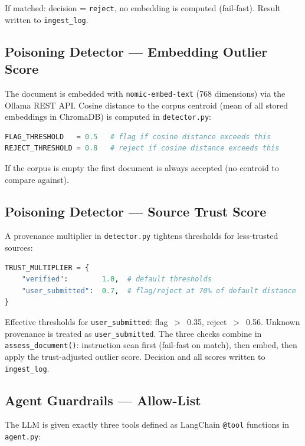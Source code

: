 \documentclass[11pt,a4paper]{article}
\begin{document}
If matched: decision = \texttt{reject}, no embedding is computed (fail-fast).
Result written to \texttt{ingest\_log}.

\subsection{Poisoning Detector --- Embedding Outlier Score}

The document is embedded with \texttt{nomic-embed-text} (768 dimensions) via
the Ollama REST API. Cosine distance to the corpus centroid (mean of all stored
embeddings in ChromaDB) is computed in \texttt{detector.py}:

\begin{lstlisting}[language=Python]
FLAG_THRESHOLD   = 0.5   # flag if cosine distance exceeds this
REJECT_THRESHOLD = 0.8   # reject if cosine distance exceeds this
\end{lstlisting}

If the corpus is empty the first document is always accepted (no centroid to
compare against).

\subsection{Poisoning Detector --- Source Trust Score}

A provenance multiplier in \texttt{detector.py} tightens thresholds for
less-trusted sources:

\begin{lstlisting}[language=Python]
TRUST_MULTIPLIER = {
    "verified":        1.0,  # default thresholds
    "user_submitted":  0.7,  # flag/reject at 70% of default distance
}
\end{lstlisting}

Effective thresholds for \texttt{user\_submitted}: flag~$>$~0.35,
reject~$>$~0.56. Unknown provenance is treated as \texttt{user\_submitted}.
The three checks combine in \texttt{assess\_document()}: instruction scan first
(fail-fast on match), then embed, then apply the trust-adjusted outlier score.
Decision and all scores written to \texttt{ingest\_log}.

\subsection{Agent Guardrails --- Allow-List}

The LLM is given exactly three tools defined as LangChain \texttt{@tool}
functions in \texttt{agent.py}:
\end{document}
